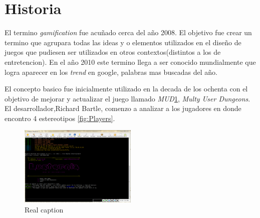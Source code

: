 \section{Historia}

El termino \emph{gamification} fue acuñado cerca del año 2008\cite{DefineGamefication}. 
El objetivo fue crear un termino que agrupara todas las ideas y o elementos utilizados en el 
diseño de juegos que pudiesen ser utilizados en otros contextos(distintos a los de entretencion). 
En el año 2010 este termino llega a ser conocido mundialmente que logra aparecer en los \emph{trend} en google\cite{LiCap1.3}, palabras mas buscadas del año.

El concepto basico fue inicialmente utilizado en la decada de los ochenta con el objetivo 
de mejorar y actualizar el juego llamado \emph{MUD}\ref{fig:MudClient}, \emph{Multy User Dungeons}.
El desarrollador,Richard Bartle, comenzo a analizar a los jugadores en donde encontro 4 estereotipos \ref{fig:Players}.

\begin{figure}[!htb]
  \centering
  \includegraphics[width=0.5\textwidth]{images/mudclient.png}
  \caption[Caption for LOF]{Real caption\footnotemark}
  \label{fig:MudClient}
\end{figure}

